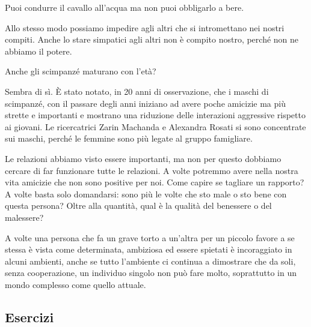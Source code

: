 \documentclass[12pt]{book} %
\begin{document}
Puoi condurre il cavallo all'acqua ma non puoi obbligarlo a bere.

Allo stesso modo possiamo impedire agli altri che si intromettano nei nostri compiti. Anche lo stare simpatici agli
altri non è compito nostro, perché non ne abbiamo il potere.

\begin{mdframed}[linewidth=1pt]
Anche gli scimpanzé maturano con l'età? 

Sembra di sì. È stato notato, in 20 anni di
osservazione, che i maschi di scimpanzé, con il passare degli anni iniziano ad avere poche amicizie ma più strette e
importanti e mostrano una riduzione delle interazioni aggressive rispetto ai giovani. Le ricercatrici Zarin Machanda e Alexandra Rosati si sono concentrate sui maschi, perché le femmine sono più legate al gruppo famigliare. 
\end{mdframed}

Le relazioni abbiamo visto essere importanti, ma non per questo dobbiamo cercare di far funzionare tutte le relazioni. A
volte potremmo avere nella nostra vita amicizie che non sono positive per noi.
Come capire se tagliare un rapporto? A volte basta solo domandarsi: sono più le volte che sto male o sto bene con questa persona? Oltre alla quantità, qual è la qualità del benessere o del malessere?

A volte una persona che fa un grave torto a un'altra per un piccolo favore a se stessa è vista come
determinata, ambiziosa ed essere spietati è incoraggiato in alcuni ambienti, anche se tutto
l'ambiente ci continua a dimostrare che da soli, senza cooperazione, un individuo singolo non può
fare molto, soprattutto in un mondo complesso come quello attuale.

\subsection{Esercizi}
\end{document}
